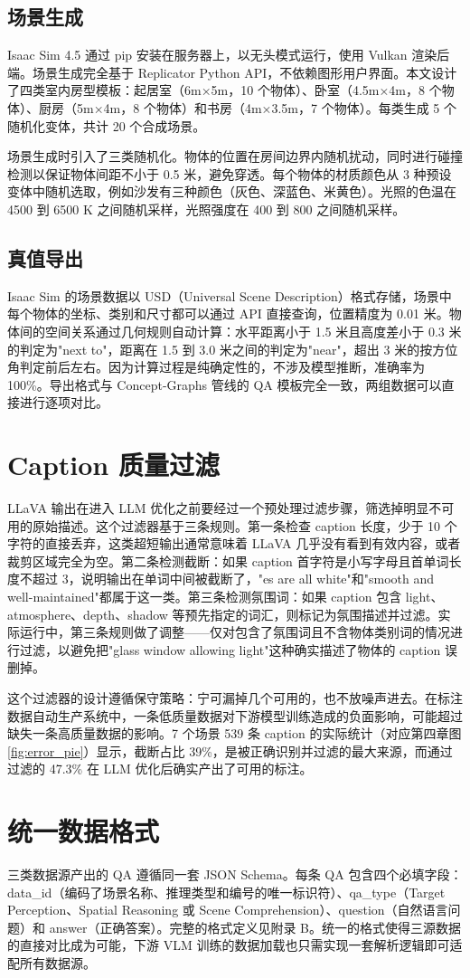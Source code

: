 \subsection{场景生成}

Isaac Sim 4.5 通过 pip 安装在服务器上，以无头模式运行，使用 Vulkan 渲染后端。场景生成完全基于 Replicator Python API，不依赖图形用户界面。本文设计了四类室内房型模板：起居室（6m×5m，10 个物体）、卧室（4.5m×4m，8 个物体）、厨房（5m×4m，8 个物体）和书房（4m×3.5m，7 个物体）。每类生成 5 个随机化变体，共计 20 个合成场景。

场景生成时引入了三类随机化。物体的位置在房间边界内随机扰动，同时进行碰撞检测以保证物体间距不小于 0.5 米，避免穿透。每个物体的材质颜色从 3 种预设变体中随机选取，例如沙发有三种颜色（灰色、深蓝色、米黄色）。光照的色温在 4500 到 6500 K 之间随机采样，光照强度在 400 到 800 之间随机采样。

\subsection{真值导出}

Isaac Sim 的场景数据以 USD（Universal Scene Description）格式存储，场景中每个物体的坐标、类别和尺寸都可以通过 API 直接查询，位置精度为 0.01 米。物体间的空间关系通过几何规则自动计算：水平距离小于 1.5 米且高度差小于 0.3 米的判定为"next to"，距离在 1.5 到 3.0 米之间的判定为"near"，超出 3 米的按方位角判定前后左右。因为计算过程是纯确定性的，不涉及模型推断，准确率为 100\%。导出格式与 Concept-Graphs 管线的 QA 模板完全一致，两组数据可以直接进行逐项对比。

\section{Caption 质量过滤}

LLaVA 输出在进入 LLM 优化之前要经过一个预处理过滤步骤，筛选掉明显不可用的原始描述。这个过滤器基于三条规则。第一条检查 caption 长度，少于 10 个字符的直接丢弃，这类超短输出通常意味着 LLaVA 几乎没有看到有效内容，或者裁剪区域完全为空。第二条检测截断：如果 caption 首字符是小写字母且首单词长度不超过 3，说明输出在单词中间被截断了，"es are all white"和"smooth and well-maintained"都属于这一类。第三条检测氛围词：如果 caption 包含 light、atmosphere、depth、shadow 等预先指定的词汇，则标记为氛围描述并过滤。实际运行中，第三条规则做了调整——仅对包含了氛围词且不含物体类别词的情况进行过滤，以避免把"glass window allowing light"这种确实描述了物体的 caption 误删掉。

这个过滤器的设计遵循保守策略：宁可漏掉几个可用的，也不放噪声进去。在标注数据自动生产系统中，一条低质量数据对下游模型训练造成的负面影响，可能超过缺失一条高质量数据的影响。7 个场景 539 条 caption 的实际统计（对应第四章图\ref{fig:error_pie}）显示，截断占比 39\%，是被正确识别并过滤的最大来源，而通过过滤的 47.3\% 在 LLM 优化后确实产出了可用的标注。

\section{统一数据格式}

三类数据源产出的 QA 遵循同一套 JSON Schema。每条 QA 包含四个必填字段：data\_id（编码了场景名称、推理类型和编号的唯一标识符）、qa\_type（Target Perception、Spatial Reasoning 或 Scene Comprehension）、question（自然语言问题）和 answer（正确答案）。完整的格式定义见附录 B。统一的格式使得三源数据的直接对比成为可能，下游 VLM 训练的数据加载也只需实现一套解析逻辑即可适配所有数据源。
